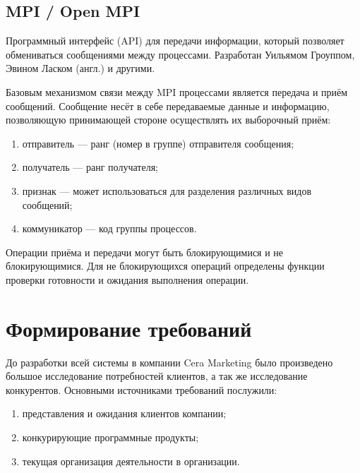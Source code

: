 \subsection{MPI / Open MPI}
Программный интерфейс (API) для передачи информации, который позволяет обмениваться сообщениями между процессами. Разработан Уильямом Гроуппом, Эвином Ласком (англ.) и другими.

Базовым механизмом связи между MPI процессами является передача и приём сообщений. Сообщение несёт в себе передаваемые данные и информацию, позволяющую принимающей стороне осуществлять их выборочный приём:
\begin{enumerate}
  \item отправитель — ранг (номер в группе) отправителя сообщения;
  \item получатель — ранг получателя;
  \item признак — может использоваться для разделения различных видов сообщений;
  \item коммуникатор — код группы процессов.
\end{enumerate}
Операции приёма и передачи могут быть блокирующимися и не блокирующимися. Для не блокирующихся операций определены функции проверки готовности и ожидания выполнения операции.






\section{Формирование требований}

До разработки всей системы в компании Cera Marketing было произведено большое исследование потребностей клиентов, а так же исследование конкурентов.
Основными источниками требований послужили:
\begin{enumerate}
  \item представления и ожидания клиентов компании;
  \item конкурирующие программные продукты;
  \item текущая организация деятельности в организации.
\end{enumerate}

